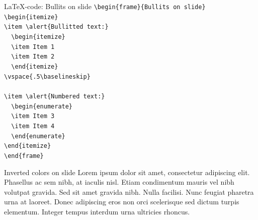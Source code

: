\documentclass[t,11pt]{beamer}
\begin{document}
\toggleslidecolors
\begin{frame}[fragile]{\LaTeX-code: Bullits on slide}
\footnotesize
\verb|\begin{frame}{Bullits on slide}|\\
\verb|\begin{itemize}|\\
\verb|\item \alert{Bullitted text:}|\\
\verb|  \begin{itemize}|\\
\verb|  \item Item 1|\\
\verb|  \item Item 2|\\
\verb|  \end{itemize}|\\
\verb|\vspace{.5\baselineskip}|\\
\verb||\\
\verb|\item \alert{Numbered text:}|\\
\verb|  \begin{enumerate}|\\
\verb|  \item Item 3|\\
\verb|  \item Item 4|\\
\verb|  \end{enumerate}|\\
\verb|\end{itemize}|\\
\verb|\end{frame}|\\
\end{frame}
\toggleslidecolors

\toggleslidecolors
\begin{frame}{Inverted colors on slide}
Lorem ipsum dolor sit amet, consectetur adipiscing elit. Phasellus ac sem nibh, at iaculis nisl. Etiam condimentum mauris vel nibh volutpat gravida. Sed sit amet gravida nibh. Nulla facilisi. Nunc feugiat pharetra urna at laoreet. Donec adipiscing eros non orci scelerisque sed dictum turpis elementum. Integer tempus interdum urna ultricies rhoncus.
\end{frame}
\toggleslidecolors
\end{document}
